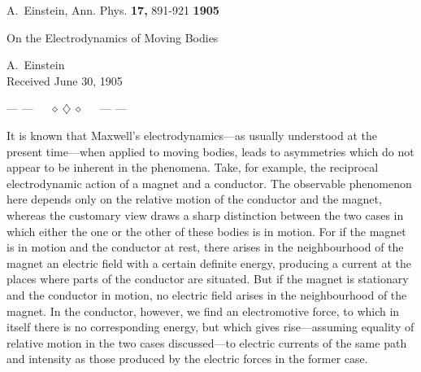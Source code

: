 \documentclass{article}
\begin{document}
A.~Einstein, Ann. Phys. {\bf 17,} 891-921 \hfill {\large \bf 1905}\\[2cm]

\begin{center}
\Large On the Electrodynamics of Moving Bodies
\end{center}

\vspace{0.5cm}

\begin{center}
A.~Einstein\\
Received June 30, 1905\\
\end{center}

\centerline{--- ---~~~$\diamond~\diamondsuit~\diamond$~~~--- ---}

\vspace{1cm}

It is known that Maxwell's electrodynamics---as usually understood at
the present time---when applied to moving bodies, leads to asymmetries
which do not appear to be inherent in the phenomena.  Take, for
example, the reciprocal electrodynamic action of a magnet and a
conductor.  The observable phenomenon here depends only on the
relative motion of the conductor and the magnet, whereas the customary
view draws a sharp distinction between the two cases in which either
the one or the other of these bodies is in motion.  For if the magnet
is in motion and the conductor at rest, there arises in the
neighbourhood of the magnet an electric field with a certain definite
energy, producing a current at the places where parts of the
conductor are situated.  But if the magnet is stationary and the
conductor in motion, no electric field arises in the neighbourhood of
the magnet.  In the conductor, however, we find an electromotive
force, to which in itself there is no corresponding energy, but which
gives rise---assuming equality of relative motion in the two cases
discussed---to electric currents of the same path and intensity as those
produced by the electric forces in the former case.
\end{document}
